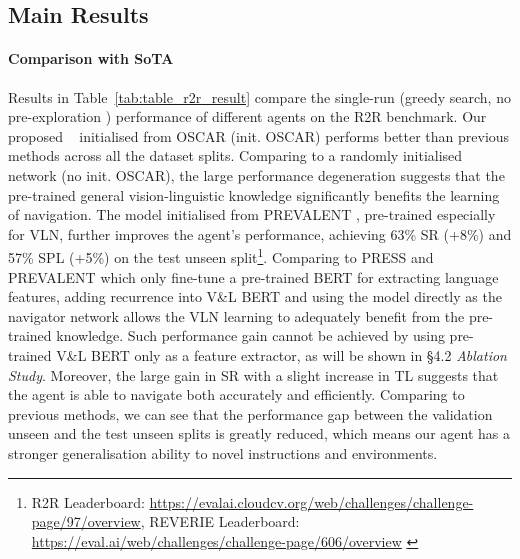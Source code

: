 \documentclass[final]{cvpr}
\begin{document}
\subsection{Main Results}

\paragraph{Comparison with SoTA}
Results in Table~\ref{tab:table_r2r_result} compare the single-run (greedy search, no pre-exploration \cite{wang2019reinforced}) performance of different agents on the R2R benchmark. Our proposed \vlnbert~ initialised from OSCAR \cite{li2020oscar} (init. OSCAR) performs better than previous methods across all the dataset splits. Comparing to a randomly initialised network (no init. OSCAR), the large performance degeneration suggests that the pre-trained general vision-linguistic knowledge significantly benefits the learning of navigation. The model initialised from PREVALENT \cite{hao2020towards}, pre-trained especially for VLN, further improves the agent's performance, achieving 63\% SR (+8\%) and 57\% SPL (+5\%) on the test unseen split\footnote{R2R Leaderboard: \href{https://evalai.cloudcv.org/web/challenges/challenge-page/97/overview}{https://evalai.cloudcv.org/web/challenges/challenge-page/97/overview}, REVERIE Leaderboard:\\ \href{https://eval.ai/web/challenges/challenge-page/606/overview}{https://eval.ai/web/challenges/challenge-page/606/overview} \label{footnote_leaderboard}}. Comparing to PRESS \cite{li2019robust} and PREVALENT \cite{hao2020towards} which only fine-tune a pre-trained BERT for extracting language features, adding recurrence into V\&L BERT and using the model directly as the navigator network allows the VLN learning to adequately benefit from the pre-trained knowledge. Such performance gain cannot be achieved by using pre-trained V\&L BERT only as a feature extractor, as will be shown in \S 4.2 \textit{Ablation Study}. Moreover, the large gain in SR with a slight increase in TL suggests that the agent is able to navigate both accurately and efficiently. Comparing to previous methods, we can see that the performance gap between the validation unseen and the test unseen splits is greatly reduced, which means our agent has a stronger generalisation ability to novel instructions and environments.
\end{document}
